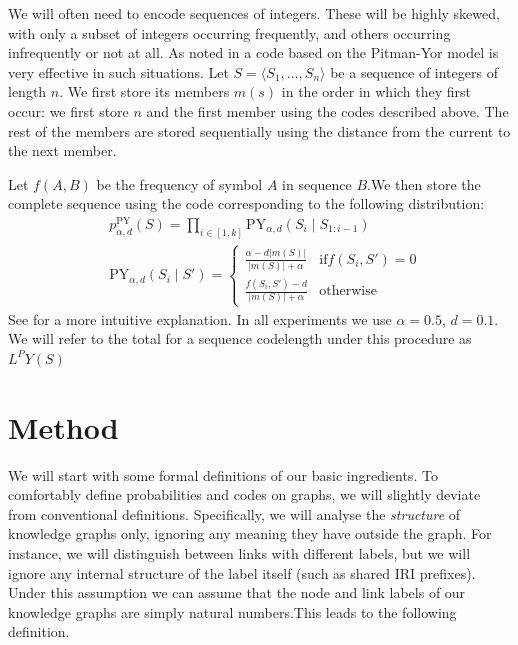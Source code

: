 \documentclass[letterpaper]{article} %
\begin{document}
We will often need to encode sequences of integers. These will be highly skewed, with only a subset of integers occurring frequently, and others occurring infrequently or not at all. As noted in \cite{de2016names} a code based on the Pitman-Yor model \cite{pitman1997two} is very effective in such situations. Let $S = \langle S_1, ..., S_n\rangle$ be a sequence of integers of length $n$. We first store its members $m(s)$ in the order in which they first occur: we first store $n$ and the first member using the codes described above. The rest of the members are stored sequentially using the distance from the current to the next member.

Let $f(A, B)$ be the frequency of symbol $A$ in sequence $B$.We then store the complete sequence using the code corresponding to the following distribution:
\begin{align*}
&p^\text{PY}_{\alpha,d}(S) = \prod_{i \in [1,k]} \text{PY}_{\alpha,d}(S_i\mid S_{1:i-1}) \\
&\text{PY}_{\alpha,d}(S_i \mid S') = 
\begin{cases}
\frac{\alpha - d |m(S)|}{|m(S)| + \alpha} & \text{if} f(S_i, S') = 0 \\ 
\frac{f(S_i, S') - d}{|m(S)| + \alpha} & \text{otherwise}
\end{cases}
\end{align*}
See \cite{de2016names} for a more intuitive explanation. In all experiments we use $\alpha = 0.5$, $d=0.1$. We will refer to the total for a sequence  codelength under this procedure as $L^PY(S)$

\section{Method}

We will start with some formal definitions of our basic ingredients. To comfortably define probabilities and codes on graphs, we will slightly deviate from conventional definitions. Specifically, we will analyse the \emph{structure} of knowledge graphs only, ignoring any meaning they have outside the graph. For instance, we will distinguish between links with different labels, but we will ignore any internal structure of the label itself (such as shared IRI prefixes). Under this assumption we can assume that the node and link labels of our knowledge graphs are simply natural numbers.\footnotemark This leads to the following definition.

\end{document}
